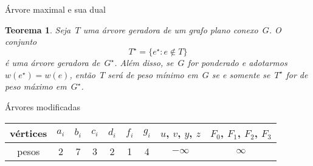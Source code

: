 \documentclass{IFES-beamer}
\newtheorem*{teorema}{Teorema}
\begin{document}
\begin{frame}{Árvore maximal e sua dual}
\begin{teorema}
\label{teo:MSFdual}
Seja~$T$ uma árvore geradora de um grafo plano conexo~$G$. O conjunto
$$
T^\star = \{e^\star:e\notin T\}
$$
é uma árvore geradora de~$G^\star$.
Além disso, se~$G$ for ponderado e adotarmos $w(e^\star) = w(e)$, então~$T$ será de peso mínimo em~$G$ se e somente se~$T^\star$ for de peso máximo em~$G^\star$.
\end{teorema}

\begin{minipage}[H]{0.6\textwidth}
\begin{figure}[H]
\scalebox{1}{

}
\end{figure}
\end{minipage}
\begin{minipage}[H]{0.3\textwidth}
\begin{figure}[H]
\scalebox{1}{

}
\end{figure}
\end{minipage}
\end{frame}


\begin{frame}{Árvores modificadas}
\centering
\vspace{-.5cm}
\scalebox{1}{

}
\begin{tabular}{| c c c c c c c c c |} 
	\hline
vértices & $a_i$ & $b_i$ & $c_i$ & $d_i$ & $f_i$ & $g_i$ & $u$, $v$, $y$, $z$ & $F_0$, $F_1$, $F_2$, $F_3$\\
	\hline
	pesos  & 2 & 7 & 3 & 2 & 1 & 4 & $-\infty$ & $\infty$ \\
	\hline
\end{tabular} 
\end{frame}
\end{document}
